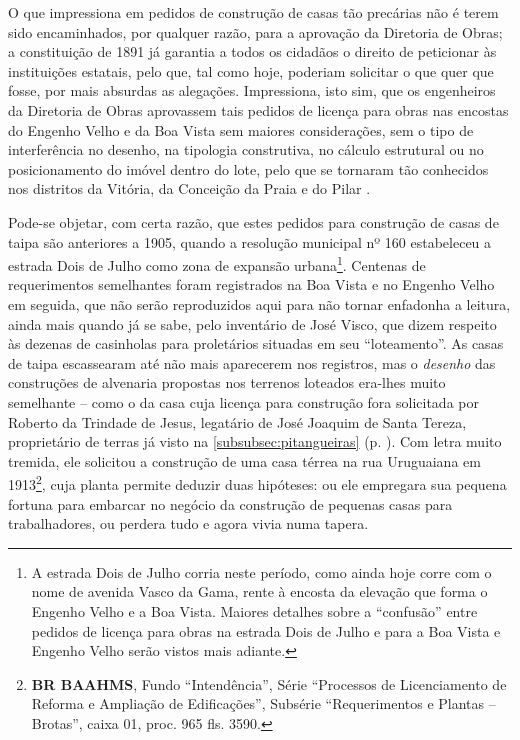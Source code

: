 O que impressiona em pedidos de construção de casas tão precárias não é terem sido encaminhados, por qualquer razão, para a aprovação da Diretoria de Obras; a constituição de 1891 já garantia a todos os cidadãos o direito de peticionar às instituições estatais, pelo que, tal como hoje, poderiam solicitar o que quer que fosse, por mais absurdas as alegações. Impressiona, isto sim, que os engenheiros da Diretoria de Obras aprovassem tais pedidos de licença para obras nas encostas do Engenho Velho e da Boa Vista sem maiores considerações, sem o tipo de interferência no desenho, na tipologia construtiva, no cálculo estrutural ou no posicionamento do imóvel dentro do lote, pelo que se tornaram tão conhecidos nos distritos da Vitória, da Conceição da Praia e do Pilar \cite{almeida_victoria_1997,almeida_vitrinescomercio_2014}. 

Pode-se objetar, com certa razão, que estes pedidos para construção de casas de taipa são anteriores a 1905, quando a resolução municipal nº 160 estabeleceu a estrada Dois de Julho como zona de expansão urbana\footnote{A estrada Dois de Julho corria neste período, como ainda hoje corre com o nome de avenida Vasco da Gama, rente à encosta da elevação que forma o Engenho Velho e a Boa Vista. Maiores detalhes sobre a ``confusão'' entre pedidos de licença para obras na estrada Dois de Julho e para a Boa Vista e Engenho Velho serão vistos mais adiante.}. Centenas de requerimentos semelhantes foram registrados na Boa Vista e no Engenho Velho em seguida, que não serão reproduzidos aqui para não tornar enfadonha a leitura, ainda mais quando já se sabe, pelo inventário de José Visco, que dizem respeito às dezenas de casinholas para proletários situadas em seu ``loteamento''. As casas de taipa escassearam até não mais aparecerem nos registros, mas o \textit{desenho} das construções de alvenaria propostas nos terrenos loteados era-lhes muito semelhante -- como o da casa cuja licença para construção fora solicitada por Roberto da Trindade de Jesus, legatário de José Joaquim de Santa Tereza, proprietário de terras já visto na \autoref{subsubsec:pitangueiras} (p. \pageref{subsubsec:pitangueiras}). Com letra muito tremida, ele solicitou a construção de uma casa térrea na rua Uruguaiana em 1913\footnote{\textbf{BR BAAHMS}, Fundo ``Intendência'', Série ``Processos de Licenciamento de Reforma e Ampliação de Edificações'', Subsérie ``Requerimentos e Plantas -- Brotas'', caixa 01, proc. 965 fls. 3590.}, cuja planta permite deduzir duas hipóteses: ou ele empregara sua pequena fortuna para embarcar no negócio da construção de pequenas casas para trabalhadores, ou perdera tudo e agora vivia numa tapera.

